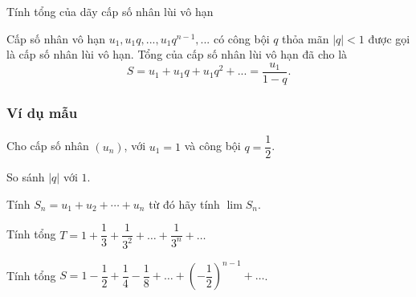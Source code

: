 \begin{dang}{Tính tổng của dãy cấp số nhân lùi vô hạn}
	\begin{dn}
		Cấp số nhân vô hạn $u_1, u_1q,...,u_1q^{n-1},...$ có công bội $q$ thỏa mãn $|q|<1$ được gọi là cấp số nhân lùi vô hạn. 
		Tổng của cấp số nhân lùi vô hạn đã cho là $$S=u_1+u_1q+u_1q^2+...=\dfrac{u_1}{1-q}.$$
	\end{dn}
\end{dang}
\subsubsection{Ví dụ mẫu}
\begin{vd}%
	Cho cấp số nhân $(u_n)$, với $u_1=1$ và công bội $q=\dfrac{1}{2}$.
	\begin{enumEX}{1}
		\item So sánh $\left|q\right|$ với $1$.
		\item Tính $S_n=u_1+u_2+\cdots+u_n$ từ đó hãy tính $\lim S_n$.
	\end{enumEX}
\end{vd}
\begin{vd}%
	Tính tổng $T=1+\dfrac{1}{3}+\dfrac{1}{3^2}+\ldots+\dfrac{1}{3^n}+\ldots$
\end{vd}
\begin{vd}
	Tính tổng $S=1-\dfrac{1}{2}+\dfrac{1}{4}-\dfrac{1}{8}+\ldots+\left(-\dfrac{1}{2}\right)^{n-1}+\ldots$.
\end{vd}

